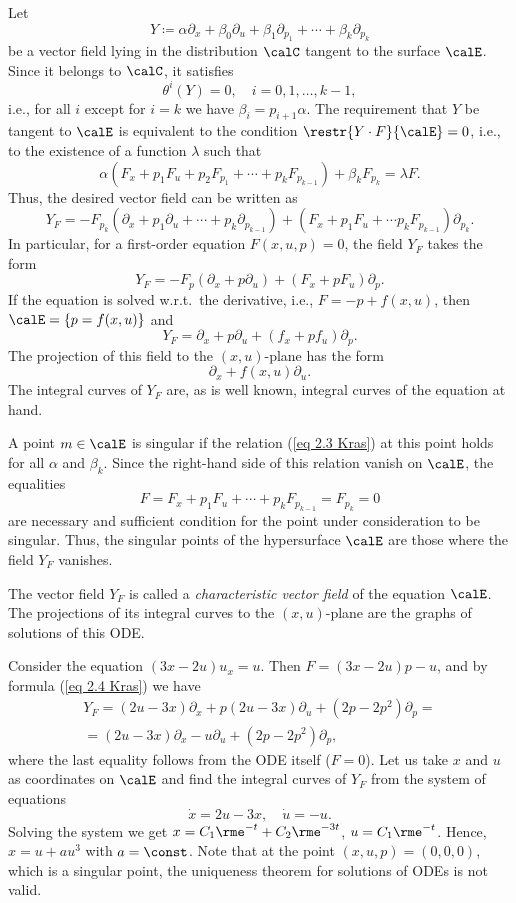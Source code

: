 Let 
\[Y\coloneqq \alpha\partial_x+\beta_0\partial_u+\beta_1\partial_{p_1}+\cdots+\beta_k\partial_{p_k}\]
be a vector field lying in the distribution $\calC$ tangent to the surface $\calE$. Since it belongs to $\calC$, it satisfies 
\[\theta^i(Y)=0,\quad i=0,1,\ldots,k-1,\]
i.e., for all $i$ except for $i=k$ we have $\beta_i=p_{i+1}\alpha$. The requirement that $Y$ be tangent to $\calE$ is equivalent to the condition $\restr{Y\cdot F}{\calE}=0$, i.e., to the existence of a function $\lambda$ such that 
\[\alpha\left(F_x+p_1F_u+p_2F_{p_1}+\cdots+p_k F_{p_{k-1}}\right)+\beta_kF_{p_k}=\lambda F.\label{eq 2.3 Kras}\]
Thus, the desired vector field can be written as 
\[
    Y_F=-F_{p_k}\left(\partial_x+p_1\partial_u+\cdots+p_k\partial_{p_{k-1}}\right)
    +\left(F_x+p_1F_u+\cdots p_kF_{p_{k-1}}\right)\partial_{p_k}.
\]
In particular, for a first-order equation $F(x,u,p)=0$, the field $Y_F$ takes the form 
\[Y_F=-F_p\left(\partial_x+p\partial_u\right)+\left(F_x+pF_u\right)\partial_p.\label{eq 2.4 Kras}\]
If the equation is solved w.r.t.\ the derivative, i.e., $F=-p+f(x,u)$, then $\calE=\{p=f(x,u)\}$ and  
\[Y_F=\partial_x+p\partial_u+\left(f_x+pf_u\right)\partial_p.\]
The projection of this field to the $(x,u)$-plane has the form 
\[\partial_x+f(x,u)\partial_u.\]
The integral curves of $Y_F$ are, as is well known, integral curves of the equation at hand. 

A point $m\in \calE$ is singular if the relation (\ref{eq 2.3 Kras}) at this point holds for all $\alpha$ and $\beta_k$. Since the right-hand side of this relation vanish on $\calE$, the equalities 
\[F=F_x+p_1F_u+\cdots+p_kF_{p_{k-1}}=F_{p_k}=0\]
are necessary and sufficient condition for the point under consideration to be singular. Thus, the singular points of the hypersurface $\calE$ are those where the field $Y_F $ vanishes. 

The vector field $Y_F$ is called a \emph{characteristic vector field} of the equation $\calE$. The projections of its integral curves to the $(x,u)$-plane are the graphs of solutions of this ODE.


\begin{example}\label{ex 2.2 Kras}
    Consider the equation $(3x-2u)u_x=u$. Then $F=(3x-2u)p-u$, and by formula (\ref{eq 2.4 Kras}) we have 
    \begin{multline}
        Y_F=(2u-3x)\partial_x+p(2u-3x)\partial_u+(2p-2p^2)\partial_p=\\
        =(2u-3x)\partial_x-u\partial_u+(2p-2p^2)\partial_p,
    \end{multline}
    where the last equality follows from the ODE itself ($F=0$). Let us take $x$ and $u$ as coordinates on $\calE$ and find the integral curves of $Y_F$ from the system of equations 
    \[\dot x=2u-3x,\quad \dot u=-u.\]
    Solving the system we get $x=C_1\rme^{-t}+C_2\rme^{-3t}$, $u=C_1\rme^{-t}$. Hence, $x=u+au^3$ with $a=\const$. Note that at the point $(x,u,p)=(0,0,0)$, which is a singular point, the uniqueness theorem for solutions of ODEs is not valid.
\end{example}







